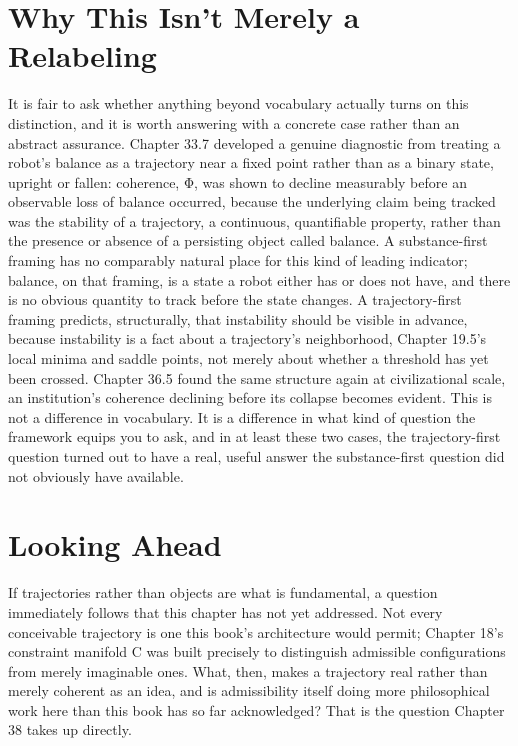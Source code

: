\section{Why This Isn't Merely a Relabeling}

It is fair to ask whether anything beyond vocabulary actually turns on this distinction, and it is worth answering with a concrete case rather than an abstract assurance. Chapter 33.7 developed a genuine diagnostic from treating a robot's balance as a trajectory near a fixed point rather than as a binary state, upright or fallen: coherence, Φ, was shown to decline measurably before an observable loss of balance occurred, because the underlying claim being tracked was the stability of a trajectory, a continuous, quantifiable property, rather than the presence or absence of a persisting object called balance. A substance-first framing has no comparably natural place for this kind of leading indicator; balance, on that framing, is a state a robot either has or does not have, and there is no obvious quantity to track before the state changes. A trajectory-first framing predicts, structurally, that instability should be visible in advance, because instability is a fact about a trajectory's neighborhood, Chapter 19.5's local minima and saddle points, not merely about whether a threshold has yet been crossed. Chapter 36.5 found the same structure again at civilizational scale, an institution's coherence declining before its collapse becomes evident. This is not a difference in vocabulary. It is a difference in what kind of question the framework equips you to ask, and in at least these two cases, the trajectory-first question turned out to have a real, useful answer the substance-first question did not obviously have available.

\section{Looking Ahead}

If trajectories rather than objects are what is fundamental, a question immediately follows that this chapter has not yet addressed. Not every conceivable trajectory is one this book's architecture would permit; Chapter 18's constraint manifold C was built precisely to distinguish admissible configurations from merely imaginable ones. What, then, makes a trajectory real rather than merely coherent as an idea, and is admissibility itself doing more philosophical work here than this book has so far acknowledged? That is the question Chapter 38 takes up directly.
